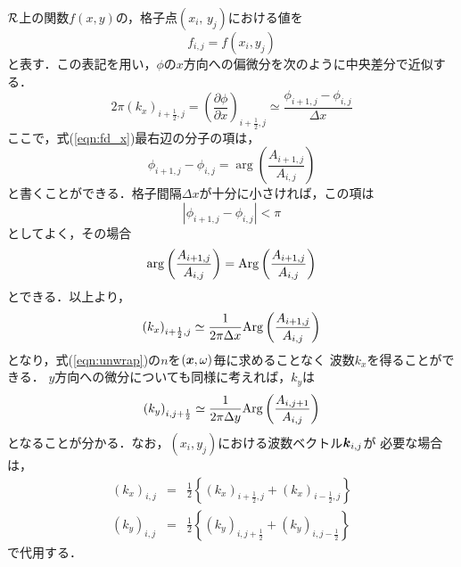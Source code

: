 $\cal R$上の関数$f(x,y)$の，格子点$(x_i,\, y_j)$における値を
\begin{equation}
	f_{i,j}=f(x_i,y_j)
	\label{eqn:}
\end{equation}
と表す．この表記を用い，$\phi$の$x$方向への偏微分を次のように中央差分で近似する．
\begin{equation}
	2\pi (k_x)_{i+\frac{1}{2},j}
	=
	\left( \frac{\partial \phi }{\partial x}\right) _{i+\frac{1}{2},j}
	\simeq 
	\frac{\phi_{i+1,j}-\phi_{i,j}}{\Delta x}
	\label{eqn:fd_x}
\end{equation}
ここで，式(\ref{eqn:fd_x})最右辺の分子の項は，
\begin{equation}
	\phi_{i+1,j}-\phi_{i,j}
	=
	\arg \left(\frac{ A_{i+1,j}}{A_{i,j}}\right)
\end{equation}
と書くことができる．格子間隔$\Delta x$が十分に小さければ，この項は
\begin{equation}
	\left| \phi_{i+1,j}-\phi_{i,j}\right| < \pi
	\label{eqn:phi_bound}
\end{equation}
としてよく，その場合
\begin{equation}
	\arg \left(\frac{ A_{i+1,j}}{A_{i,j}}\right)
	=
	{\rm Arg}\left(\frac{ A_{i+1,j}}{A_{i,j}}\right)
\end{equation}
とできる．以上より，
\begin{equation}
	\left( k_x \right)_{i+\frac{1}{2},j} 
	\simeq 
	\frac{1}{2\pi \Delta x}
	{\rm Arg} \left( \frac{ A_{i+1,j}}{A_{i,j}} \right)
	\label{eqn:kx_FD}
\end{equation}
となり，式(\ref{eqn:unwrap})の$n$を$(\mbox{\boldmath{$x$}},\omega)$毎に求めることなく
波数$k_x$を得ることができる．
$y$方向への微分についても同様に考えれば，$k_y$は
\begin{equation}
	\left( k_y \right)_{i,j+\frac{1}{2}} 
	\simeq 
	\frac{1}{2\pi \Delta y}
	{\rm Arg} \left( \frac{ A_{i,j+1}}{A_{i,j}} \right)
	\label{eqn:ky_FD}
\end{equation}
となることが分かる．なお，$(x_i,y_j)$における波数ベクトル$\mbox{\boldmath{$k$}}_{i,j}$が
必要な場合は，
\begin{eqnarray}
	(k_x)_{i,j} &=&
	\frac{1}{2}\left\{ (k_x)_{i+\frac{1}{2},j}+ (k_x)_{i-\frac{1}{2},j} \right\}
	\label{eqn:} \\
	(k_y)_{i,j} &=&
	\frac{1}{2}\left\{ (k_y)_{i,j+\frac{1}{2}}+ (k_y)_{i,j-\frac{1}{2}} \right\}
	\label{eqn:}
\end{eqnarray}
で代用する．
